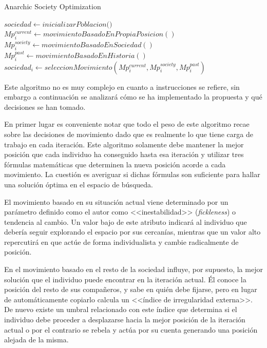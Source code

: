 \begin{algorithm}
	\caption{Anarchic Society Optimization}
	\begin{algorithmic}[1]
		\State $sociedad \gets \textit{inicializarPoblacion()}$
		\State $Mp^{current}_i \gets movimientoBasadoEnPropiaPosicion()$
		\State $Mp^{society}_i \gets movimientoBasadoEnSociedad()$
		\State $Mp^{past}_i \gets movimientoBasadoEnHistoria()$
		\State $sociedad_i \gets seleccionMovimiento(Mp^{current}_i, Mp^{society}_i, Mp^{past}_i)$
		\EndWhile
	\end{algorithmic}
\end{algorithm}

Este algoritmo no es muy complejo en cuanto a instrucciones se refiere, sin embargo a continuación se analizará cómo se ha implementado la propuesta y qué decisiones se han tomado.

En primer lugar es conveniente notar que todo el peso de este algoritmo recae sobre las decisiones de movimiento dado que es realmente lo que tiene carga de trabajo en cada iteración. Este algoritmo solamente debe mantener la mejor posición que cada individuo ha conseguido hasta esa iteración y utilizar tres fórmulas matemáticas que determinen la nueva posición acorde a cada movimiento. La cuestión es averiguar si dichas fórmulas son suficiente para hallar una solución óptima en el espacio de búsqueda.

El movimiento basado en su situación actual viene determinado por un parámetro definido como el autor como <<inestabilidad>> (\textit{fickleness}) o tendencia al cambio. Un valor bajo de este atributo indicará al individuo que debería seguir explorando el espacio por sus cercanías, mientras que un valor alto repercutirá en que actúe de forma individualista y cambie radicalmente de posición.

En el movimiento basado en el resto de la sociedad influye, por supuesto, la mejor solución que el individuo puede encontrar en la iteración actual. Él conoce la posición del resto de sus compañeros, y sabe en quién debe fijarse, pero en lugar de automáticamente copiarlo calcula un <<índice de irregularidad externa>>. De nuevo existe un umbral relacionado con este índice que determina si el individuo debe proceder a desplazarse hacia la mejor posición de la iteración actual o por el contrario se rebela y actúa por su cuenta generando una posición alejada de la misma.

